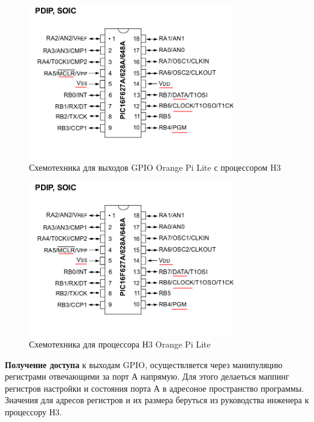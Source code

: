 \begin{figure}[h!]
    \centering
    \includegraphics[width=0.8\textwidth]{2017-05-07_at_22:31:52_screenshot.png}
    \caption{Схемотехника для выходов GPIO Orange Pi Lite с процессором H3}
\end{figure}

\begin{figure}[h!]
    \centering
    \includegraphics[width=0.8\textwidth]{2017-05-07_at_22:31:52_screenshot.png}
    \caption{Схемотехника для процессора Н3 Orange Pi Lite}
\end{figure}

\textbf{Получение доступа} к выходам GPIO, осуществляется через манипуляцию регистрами отвечающими за порт А напрямую. Для этого делаеться маппинг регистров настройки и состояния порта А в адресоное пространство программы. Значения для адресов регистров и их размера беруться из руководства инженера к процессору Н3.


